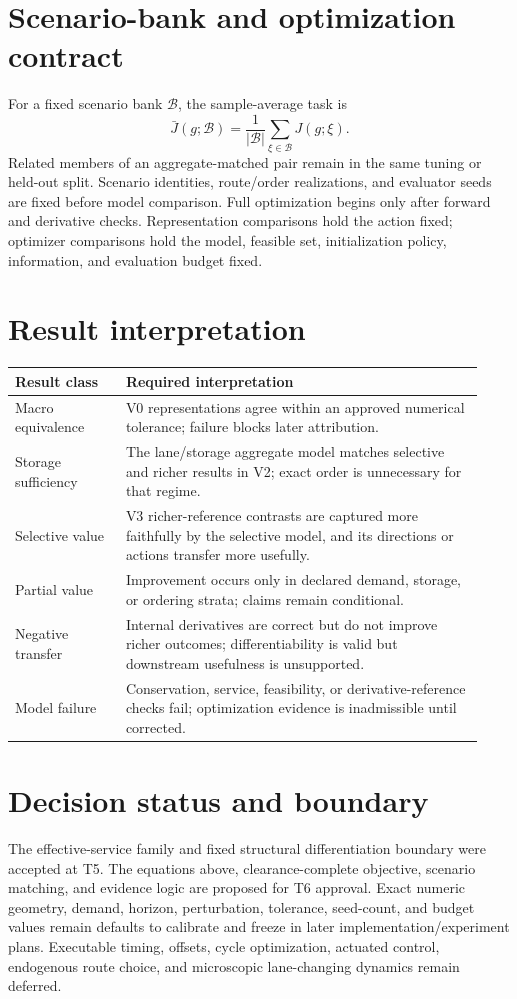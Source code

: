 \documentclass[10pt]{article}
\begin{document}
\section{Scenario-bank and optimization contract}
For a fixed scenario bank $\mathcal{B}$, the sample-average task is
\[
  \bar J(g;\mathcal{B})=\frac{1}{|\mathcal{B}|}
  \sum_{\xi\in\mathcal{B}}J(g;\xi).
\]
Related members of an aggregate-matched pair remain in the same tuning or held-out split. Scenario identities, route/order realizations, and evaluator seeds are fixed before model comparison. Full optimization begins only after forward and derivative checks. Representation comparisons hold the action fixed; optimizer comparisons hold the model, feasible set, initialization policy, information, and evaluation budget fixed.

\section{Result interpretation}
\begin{tabular}{>{\raggedright\arraybackslash}p{0.22\linewidth}p{0.71\linewidth}}
\toprule
Result class & Required interpretation \\
\midrule
Macro equivalence & V0 representations agree within an approved numerical tolerance; failure blocks later attribution. \\
Storage sufficiency & The lane/storage aggregate model matches selective and richer results in V2; exact order is unnecessary for that regime. \\
Selective value & V3 richer-reference contrasts are captured more faithfully by the selective model, and its directions or actions transfer more usefully. \\
Partial value & Improvement occurs only in declared demand, storage, or ordering strata; claims remain conditional. \\
Negative transfer & Internal derivatives are correct but do not improve richer outcomes; differentiability is valid but downstream usefulness is unsupported. \\
Model failure & Conservation, service, feasibility, or derivative-reference checks fail; optimization evidence is inadmissible until corrected. \\
\bottomrule
\end{tabular}

\section{Decision status and boundary}
The effective-service family and fixed structural differentiation boundary were accepted at T5. The equations above, clearance-complete objective, scenario matching, and evidence logic are proposed for T6 approval. Exact numeric geometry, demand, horizon, perturbation, tolerance, seed-count, and budget values remain defaults to calibrate and freeze in later implementation/experiment plans. Executable timing, offsets, cycle optimization, actuated control, endogenous route choice, and microscopic lane-changing dynamics remain deferred.
\end{document}
